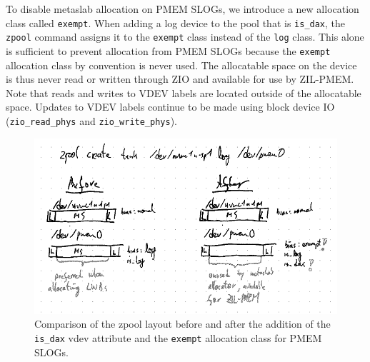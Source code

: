 \documentclass[12pt,a4paper,twoside]{book}
\begin{document}
To disable metaslab allocation on PMEM SLOGs, we introduce a new allocation class called \lstinline{exempt}.
When adding a log device to the pool that is \lstinline{is_dax}, the \lstinline{zpool} command assigns it to the \lstinline{exempt} class instead of the \lstinline{log} class.
This alone is sufficient to prevent allocation from PMEM SLOGs because the \lstinline{exempt} allocation class by convention is never used.
The allocatable space on the device is thus never read or written through ZIO and available for use by ZIL-PMEM.
Note that reads and writes to VDEV labels are located outside of the allocatable space.
Updates to VDEV labels continue to be made using block device IO (\lstinline{zio_read_phys} and \lstinline{zio_write_phys}).

\begin{figure}[h]
    \includegraphics[width=\textwidth]{fig/pmem_aware_vdev_layer_before_after}
    \caption{
        Comparison of the zpool layout before and after the addition of the \lstinline{is_dax} vdev attribute and the \lstinline{exempt} allocation class for PMEM SLOGs.
    }
\end{figure}

\clearpage
\end{document}
